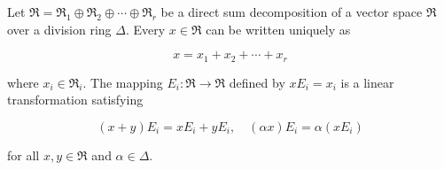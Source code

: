 Let $\mathfrak{R} = \mathfrak{R}_1 \oplus \mathfrak{R}_2 \oplus \cdots \oplus \mathfrak{R}_r$ be a direct sum decomposition of a vector space $\mathfrak{R}$ over a division ring $\Delta$. Every $x \in \mathfrak{R}$ can be written uniquely as

$$x = x_1 + x_2 + \cdots + x_r$$

where $x_i \in \mathfrak{R}_i$. The mapping $E_i : \mathfrak{R} \to \mathfrak{R}$ defined by $x E_i = x_i$ is a linear transformation satisfying

$$(x + y)E_i = xE_i + yE_i, \quad (\alpha x)E_i = \alpha(xE_i)$$

for all $x, y \in \mathfrak{R}$ and $\alpha \in \Delta$.
